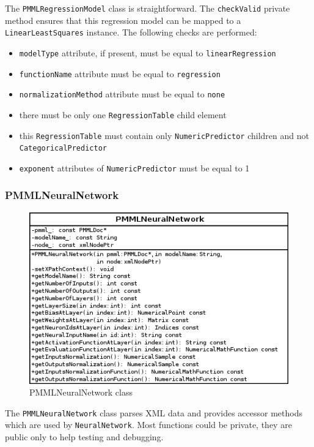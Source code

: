 The \texttt{PMMLRegressionModel} class is straightforward.  The \texttt{checkValid} private method ensures that
this regression model can be mapped to a \texttt{LinearLeastSquares} instance.  The following checks are performed:
\begin{itemize}
\setlength{\itemsep}{0pt}
\item \texttt{modelType} attribute, if present, must be equal to \texttt{linearRegression}
\item \texttt{functionName} attribute must be equal to \texttt{regression}
\item \texttt{normalizationMethod} attribute must be equal to \texttt{none}
\item there must be only one \texttt{RegressionTable} child element
\item this \texttt{RegressionTable} must contain only \texttt{NumericPredictor} children and not \texttt{CategoricalPredictor}
\item \texttt{exponent} attributes of \texttt{NumericPredictor} must be equal to 1
\end{itemize}

\subsubsection{PMMLNeuralNetwork}

\begin{figure}[htb]
  \begin{center}
    \includegraphics[scale=0.7]{PMMLNeuralNetwork.png}
    \caption{PMMLNeuralNetwork class}\label{fig:archi:PMMLNeuralNetwork}
  \end{center}
\end{figure}

The \texttt{PMMLNeuralNetwork} class parses XML data and provides accessor methods which are used by \texttt{NeuralNetwork}.
Most functions could be private, they are public only to help testing and debugging.

